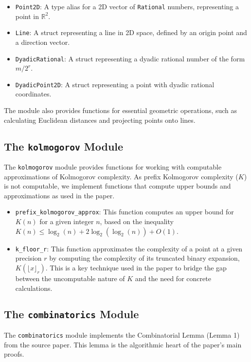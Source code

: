 \documentclass{article}
\begin{document}
\begin{itemize}
    \item \texttt{Point2D}: A type alias for a 2D vector of \texttt{Rational} numbers, representing a point in $\mathbb{R}^2$.
    \item \texttt{Line}: A struct representing a line in 2D space, defined by an origin point and a direction vector.
    \item \texttt{DyadicRational}: A struct representing a dyadic rational number of the form $m/2^r$.
    \item \texttt{DyadicPoint2D}: A struct representing a point with dyadic rational coordinates.
\end{itemize}

The module also provides functions for essential geometric operations, such as calculating Euclidean distances and projecting points onto lines.

\subsection{The \texttt{kolmogorov} Module}

The \texttt{kolmogorov} module provides functions for working with computable approximations of Kolmogorov complexity. As prefix Kolmogorov complexity ($K$) is not computable, we implement functions that compute upper bounds and approximations as used in the paper.

\begin{itemize}
    \item \texttt{prefix\_kolmogorov\_approx}: This function computes an upper bound for $K(n)$ for a given integer $n$, based on the inequality $K(n) \le \log_2(n) + 2\log_2(\log_2(n)) + O(1)$.
    \item \texttt{k\_floor\_r}: This function approximates the complexity of a point at a given precision $r$ by computing the complexity of its truncated binary expansion, $K(\lfloor x \rfloor_r)$. This is a key technique used in the paper to bridge the gap between the uncomputable nature of $K$ and the need for concrete calculations.
\end{itemize}

\subsection{The \texttt{combinatorics} Module}

The \texttt{combinatorics} module implements the Combinatorial Lemma (Lemma 1) from the source paper. This lemma is the algorithmic heart of the paper's main proofs.
\end{document}
